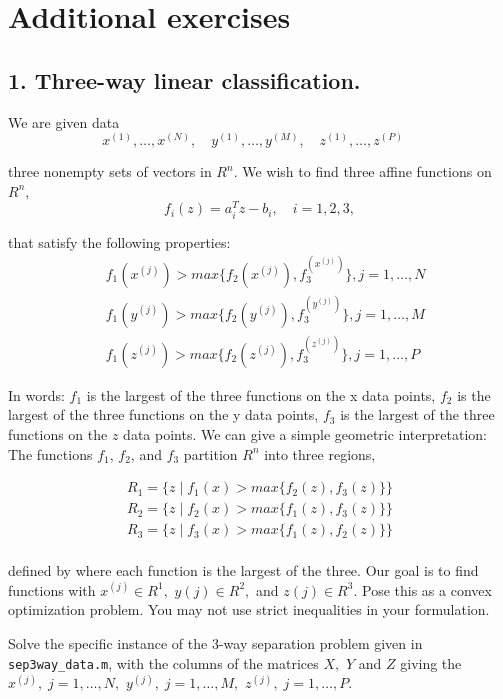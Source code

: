 \documentclass{article}
\begin{document}
\section*{Additional exercises}

\subsection*{1. Three-way linear classification.}

We are given data
$$
x^{(1)}, \dots, x^{(N)}, \quad
y^{(1)}, \dots, y^{(M)}, \quad
z^{(1)}, \dots, z^{(P)} \quad
$$

three nonempty sets of vectors in $R^n.$ We wish to find three affine functions on $R^n,$ 
$$
f_i(z) = a_i^T z - b_i, \quad i = 1, 2, 3,
$$

that satisfy the following properties:
\begin{align*}
	&f_1(x^{(j)}) > max\{f_2(x^{(j)}), f_3^{(x^{(j)})}\}, j = 1, \dots, N 
	\\
	&f_1(y^{(j)}) > max\{f_2(y^{(j)}), f_3^{(y^{(j)})}\}, j = 1, \dots, M 
	\\
	&f_1(z^{(j)}) > max\{f_2(z^{(j)}), f_3^{(z^{(j)})}\}, j = 1, \dots, P 
\end{align*}

In words: $f_1$ is the largest of the three functions on the x data points, $f_2$ is the largest of the three functions on the y data points, $f_3$ is the largest of the three functions on the $z$ data points. We can give a simple geometric interpretation: The functions $f_1$, $f_2$, and $f_3$ partition $R^n$ into three regions,

\begin{align*}
	R_1 = \{z\;|\; f_1(x) > max\{f_2(z), f_3(z)\}\} 
	\\
	R_2 = \{z\;|\; f_2(x) > max\{f_1(z), f_3(z)\}\} 
	\\
	R_3 = \{z\;|\; f_3(x) > max\{f_1(z), f_2(z)\}\} 
	\\
\end{align*}

defined by where each function is the largest of the three. Our goal is to find functions
with $x^{(j)} \in R^1,$ $y(j) \in R^2, $ and $z(j) \in R^3.$ Pose this as a convex optimization problem. You may not use strict inequalities in your formulation.

Solve the specific instance of the 3-way separation problem given in \verb|sep3way_data.m|,
with the columns of the matrices $X,$ $Y$ and $Z$ giving the $x^{(j)}, \; j = 1, \dots, N,$
$y^{(j)}, \; j = 1, \dots, M,$
$z^{(j)}, \; j = 1, \dots, P.$
\end{document}
